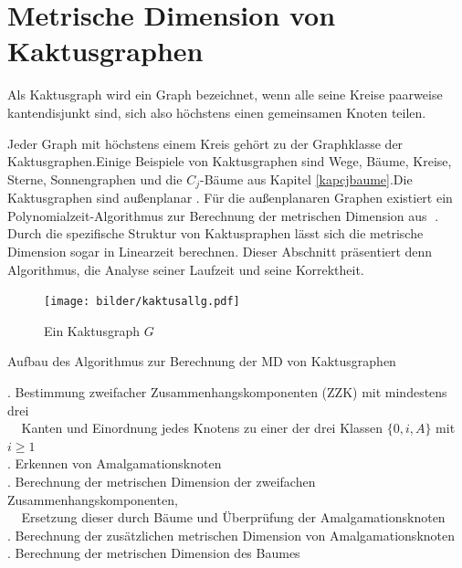 \chapter{Metrische Dimension von Kaktusgraphen}
\label{kapkaktus}
\begin{defi}
Als Kaktusgraph wird ein Graph bezeichnet, wenn alle seine Kreise paarweise kantendisjunkt sind, sich also höchstens einen gemeinsamen Knoten teilen.
\end{defi}
Jeder Graph mit höchstens einem Kreis gehört zu der Graphklasse der Kaktusgraphen.\newline Einige Beispiele von Kaktusgraphen sind Wege, Bäume, Kreise, Sterne, Sonnengraphen und die $C_j$-Bäume aus Kapitel \ref{kapcjbaume}.\newline Die Kaktusgraphen sind außenplanar \cite{graphclasses}. Für die außenplanaren Graphen existiert ein Polynomialzeit-Algorithmus zur Berechnung der metrischen Dimension aus \grqq$\;$\cite{aussenplanar}. Durch die spezifische Struktur von Kaktuspraphen lässt sich die metrische Dimension sogar in Linearzeit berechnen. Dieser Abschnitt präsentiert denn Algorithmus, die Analyse seiner Laufzeit und seine Korrektheit.
\begin{figure}[h!]
		\centering
 		 \texttt{[image: bilder/kaktusallg.pdf]}
   \caption{Ein Kaktusgraph $G$}
   \label{gk}
  	 \end{figure}
  	 \vspace{-2mm}
\begin{algorithm}
\caption{Aufbau des Algorithmus zur Berechnung der MD von Kaktusgraphen}
\begin{algorithmic}
\vspace{2mm}
\vspace{2mm}
\vspace{2mm}
. Bestimmung zweifacher Zusammenhangskomponenten (ZZK) mit mindestens drei\\$\;\;\;\;$Kanten und Einordnung jedes Knotens zu einer der drei Klassen $\{0,i,A\}$ mit $i \geq 1$\\
\vspace{2mm}
. Erkennen von Amalgamationsknoten\\
\vspace{2mm}
. Berechnung der metrischen Dimension der zweifachen Zusammenhangskomponenten,\\$\;\;\;\;$Ersetzung dieser durch Bäume und Überprüfung der Amalgamationsknoten\\
\vspace{2mm}
. Berechnung der zusätzlichen metrischen Dimension von Amalgamationsknoten\\
\vspace{2mm}
. Berechnung der metrischen Dimension des Baumes
\vspace{2mm}
\end{algorithmic}
\end{algorithm}
\newpage
